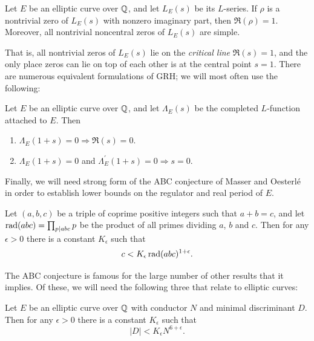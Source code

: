 \documentclass[10pt]{article}
\newcommand{\pr}{^{\prime}}
\newcommand{\Les}{L_E(s)}
\newcommand{\Lams}{\Lambda_E(s)}
\begin{document}
\begin{conjecture}\label{conj:GRH1}
Let $E$ be an elliptic curve over $\mathbb{Q}$, and let $\Les$ be its $L$-series. If $\rho$ is a nontrivial zero of $\Les$ with nonzero imaginary part, then $\Re(\rho) = 1$. Moreover, all nontrivial noncentral zeros of $\Les$ are simple.
\end{conjecture}
That is, all nontrivial zeros of $\Les$ lie on the {\it critical line} $\Re(s)=1$, and the only place zeros can lie on top of each other is at the central point $s=1$. There are numerous equivalent formulations of GRH; we will most often use the following:
\begin{conjecture}\label{conj:GRH2}
 \mbox{}
 Let $E$ be an elliptic curve over $\mathbb{Q}$, and let $\Lams$ be the completed $L$-function attached to $E$. Then
\begin{enumerate}
\item $\Lambda_E(1+s) = 0 \Longrightarrow \Re(s) = 0$.
\item $\Lambda_E(1+s) = 0$ and $\Lambda_E\pr(1+s) = 0 \Longrightarrow s=0$.
\end{enumerate}
\end{conjecture}

Finally, we will need strong form of the ABC conjecture of Masser and Oesterl\'{e} in order to establish lower bounds on the regulator and real period of $E$.
\begin{conjecture} \label{conj:ABC}
Let $(a,b,c)$ be a triple of coprime positive integers such that $a+b = c$, and let $\operatorname{rad}(abc) = \prod_{p | abc} p$ be the product of all primes dividing $a$, $b$ and $c$. Then for any $\epsilon > 0$ there is a constant $K_{\epsilon}$ such that
\begin{equation}
c < K_{\epsilon}\operatorname{rad}(abc)^{1+\epsilon}.
\end{equation}
\end{conjecture}
The ABC conjecture is famous for the large number of other results that it implies. Of these, we will need the following three that relate to elliptic curves:

\begin{conjecture}[Szpiro]\label{conj:Szpiro}
Let $E$ be an elliptic curve over $\mathbb{Q}$ with conductor $N$ and minimal discriminant $D$. Then for any $\epsilon > 0$ there is a constant $K_{\epsilon}$ such that
\begin{equation}
|D| < K_{\epsilon}N^{6+\epsilon}.
\end{equation}
\end{conjecture}
\end{document}
